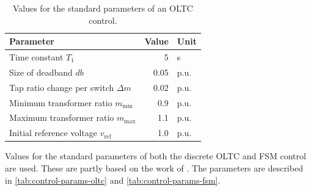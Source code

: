 \begin{table}[htbp!]
    \caption[Values for the standard parameters of an \acs{OLTC} control]{Values for the standard parameters of an \acs{OLTC} control.}
    \label{tab:control-params-oltc}
    \vspace*{12pt}
    \centering
    \small
    \begin{tabularx}{\textwidth}{Xrl}
        \textbf{Parameter} & \textbf{Value} & \textbf{Unit} \\ \hline
        \toprule
        Time constant $T_1$ & 5 & s \\
        Size of deadband $db$ & 0.05 & p.u. \\
        Tap ratio change per switch $\Delta m$ & 0.02 & p.u. \\
        Minimum transformer ratio $m_\mathrm{min}$ & 0.9 & p.u. \\
        Maximum transformer ratio $m_\mathrm{max}$ & 1.1 & p.u. \\
        Initial reference voltage $v_\mathrm{ref}$ & 1.0 & p.u. \\
        \bottomrule
    \end{tabularx}
\end{table}

Values for the standard parameters of both the discrete \acs{OLTC} and \acs{FSM} control are used.
These are partly based on the work of \autocite{burlakin_2024,kordowich_2023}.
The parameters are described in \autoref{tab:control-params-oltc} and \autoref{tab:control-params-fsm}.

